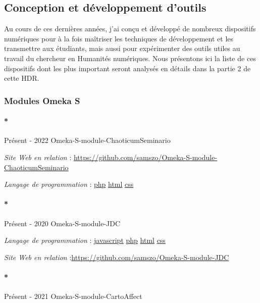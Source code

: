 \documentclass[
  a4paper,
  DIV=11,
  numbers=noendperiod]{scrreprt}
\let\oldparagraph\paragraph
\renewcommand{\paragraph}[1]{\oldparagraph{#1}\mbox{}}
\begin{document}
\subsection{Conception et développement d'outils}\label{sec-item299386}

Au cours de ces dernières années, j'ai conçu et développé de nombreux
dispositifs numériques pour à la fois maîtriser les techniques de
développement et les transmettre aux étudiants, mais aussi pour
expérimenter des outils utiles au travail du chercheur en Humanités
numériques. Nous présentons ici la liste de ces dispositifs dont les
plus important seront analysés en détails dans la partie 2 de cette HDR.

\subsubsection{Modules Omeka S}\label{sec-item300724}

\paragraph*{Présent - 2022
Omeka-S-module-ChaoticumSeminario}\label{sec-item299722}

\emph{Site Web en relation} :
\url{https://github.com/samszo/Omeka-S-module-ChaoticumSeminario}

\emph{Langage de programmation} :
\href{http://localhost/samszo/omk/s/fiches/item/108369}{php}
\href{http://localhost/samszo/omk/s/fiches/item/96621}{html}
\href{http://localhost/samszo/omk/s/fiches/item/102418}{css}

\paragraph*{Présent - 2020 Omeka-S-module-JDC}\label{sec-item299713}

\emph{Langage de programmation} :
\href{http://localhost/samszo/omk/s/fiches/item/89711}{javascript}
\href{http://localhost/samszo/omk/s/fiches/item/108369}{php}
\href{http://localhost/samszo/omk/s/fiches/item/96621}{html}
\href{http://localhost/samszo/omk/s/fiches/item/102418}{css}

\emph{Site Web en relation}
:\url{https://github.com/samszo/Omeka-S-module-JDC}

\paragraph*{Présent - 2021
Omeka-S-module-CartoAffect}\label{sec-item299714}
\end{document}
